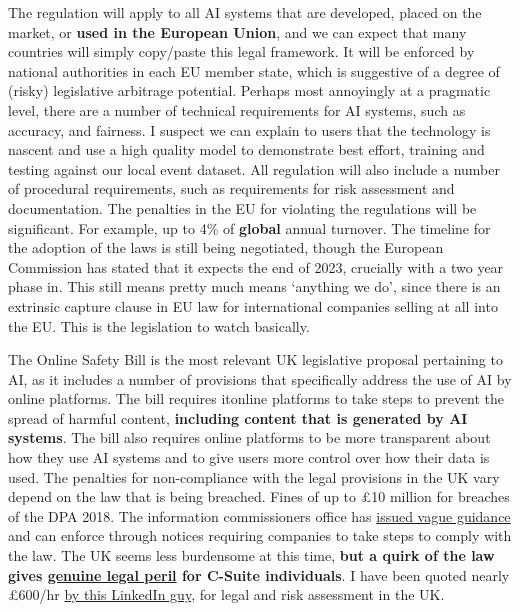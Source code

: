 The regulation will apply to all AI systems that are developed, placed on the market, or \textbf{used in the European Union}, and we can expect that many countries will simply copy/paste this legal framework. It will be enforced by national authorities in each EU member state, which is suggestive of a degree of (risky) legislative arbitrage potential. Perhaps most annoyingly at a pragmatic level, there are a number of technical requirements for AI systems, such as accuracy, and fairness. I suspect we can explain to users that the technology is nascent and use a high quality model to demonstrate best effort, training and testing against our local event dataset. All regulation will also include a number of procedural requirements, such as requirements for risk assessment and documentation. The penalties in the EU for violating the regulations will be significant. For example, up to 4\% of \textbf{global} annual turnover. The timeline for the adoption of the laws is still being negotiated, though the European Commission has stated that it expects the end of 2023, crucially with a two year phase in. This still means pretty much means `anything we do', since there is an extrinsic capture clause in EU law for international companies selling at all into the EU. This is the legislation to watch basically.\par
The Online Safety Bill is the most relevant UK legislative proposal pertaining to AI, as it includes a number of provisions that specifically address the use of AI by online platforms. The bill requires it{online} platforms to take steps to prevent the spread of harmful content, \textbf{including content that is generated by AI systems}. The bill also requires online platforms to be more transparent about how they use AI systems and to give users more control over how their data is used. The penalties for non-compliance with the legal provisions in the UK vary depend on the law that is being breached. Fines of up to £10 million for breaches of the DPA 2018. The information commissioners office has \href{https://ico.org.uk/for-organisations/uk-gdpr-guidance-and-resources/artificial-intelligence/guidance-on-ai-and-data-protection/how-should-we-assess-security-and-data-minimisation-in-ai/}{issued vague guidance} and can enforce through notices requiring companies to take steps to comply with the law. The UK seems less burdensome at this time, \textbf{but a quirk of the law gives \href{https://webdevlaw.uk/2022/11/21/a-quick-hypothetical-situation-or-your-crash-introduction-to-the-real-world/}{genuine legal peril} for C-Suite individuals}. I have been quoted nearly £600/hr \href{https://www.linkedin.com/in/barry-scannell-bbb5aa207/}{by this LinkedIn guy}, for legal and risk assessment in the UK.\par
